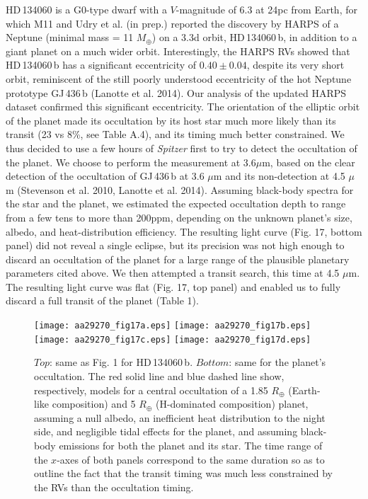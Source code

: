 \documentclass[traditabstract]{aa}
\begin{document}
HD\,134060 is a G0-type dwarf with a $V$-magnitude of 6.3 at 24pc from Earth, for which M11 and Udry et al. (in prep.) reported the discovery by HARPS of a Neptune (minimal mass = 11 $M_\oplus$) on a 3.3d orbit, HD\,134060\,b, in addition to a giant planet on a much wider orbit. Interestingly, the HARPS RVs showed that HD\,134060\,b has a significant eccentricity of $0.40 \pm 0.04$, despite its very short orbit, reminiscent of the still poorly understood eccentricity of the hot Neptune prototype GJ\,436\,b (Lanotte et al. 2014). Our analysis 
of the updated HARPS dataset confirmed this significant eccentricity. The orientation of the elliptic orbit of the planet made its occultation by its host star much more likely than its transit (23 vs 8\%, see Table A.4), and its timing much better constrained. We thus decided to use a few hours of {\it Spitzer} first to try to detect the occultation of the planet. We choose to perform the measurement at 3.6$\mu$m, based on the clear detection of the occultation of GJ\,436\,b at 3.6 $\mu$m and its non-detection at 4.5 $\mu$m (Stevenson et al. 2010, Lanotte et al. 2014). Assuming black-body spectra for the star and the planet, we estimated the expected occultation depth to range from a few tens to more than 200ppm, depending on the unknown planet's size, albedo, and heat-distribution efficiency. The resulting light curve (Fig. 17, bottom panel) did not reveal a single eclipse, but its precision was not high enough to discard an occultation of the planet for a large range of the plausible planetary parameters cited above. We then attempted a transit search, this time at 4.5 $\mu$m.  The resulting light curve was flat (Fig. 17, top panel) and enabled us to fully discard a full transit of the planet (Table 1).

\begin{figure}
\label{fig:19}
\centering                     
\texttt{[image: aa29270\_fig17a.eps]}
\texttt{[image: aa29270\_fig17b.eps]}
\texttt{[image: aa29270\_fig17c.eps]}
\texttt{[image: aa29270\_fig17d.eps]}
\caption{$Top$: same as Fig. 1 for HD\,134060\,b. $Bottom$: same for the planet's occultation.  The red solid line and blue dashed line show, respectively, models for a central occultation of a 1.85 $R_\oplus$ (Earth-like composition) and 5 $R_\oplus$ (H-dominated composition) planet,  assuming  a null albedo, an inefficient heat distribution to the night side, and negligible tidal effects for the planet, and assuming black-body emissions for both the planet and its star. The time range of the $x$-axes of both panels correspond to the same duration so as to outline the fact that the transit timing was much less constrained by the RVs than the occultation timing.}
\end{figure} 
\end{document}
